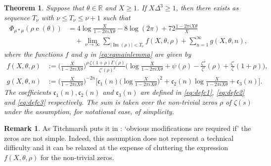 \documentclass[11pt]{amsart}
\numberwithin{equation}{section}
\numberwithin{figure}{section}
\newtheorem{theorem}{Theorem}[section]
\theoremstyle{definition}
\newtheorem{remark}{Remark}[section]
\newcommand{\R}{\mathbb{R}}
\newcommand{\e}{\operatorname{e}}
\begin{document}
\begin{theorem} \label{lem:principalmajor}
Suppose that $\theta \in \R$ and $X \ge 1$. If $X \Delta^3 \ge 1$, then there exists as sequence $T_{\nu}$ with $\nu \leqslant T_\nu \leqslant \nu+1$ such that
\begin{align} \label{eq:eqmainlemma}
    \Phi_{\mu * \mu}(\rho \e(\theta)) &= 4 \log \frac{X}{1-2\pi i X\theta} - 8 \log(2 \pi) + 72 \frac{1-2\pi i X\theta}{X}\nonumber \\
    & \quad + \lim_{\nu \to \infty} \sum_{|\operatorname{Im}(\rho)| < T_\nu}  f(X,\theta,\rho)  +\sum_{n=1}^{\infty} g(X,\theta,n),
\end{align}
where the functions $f$ and $g$ in \eqref{eq:eqmainlemma} are given by
\begin{align}
    f(X, \theta, \rho) &:= \bigg(\frac{X}{1-2\pi i X\theta}\bigg)^{\rho}\frac{\zeta (1 + \rho )\Gamma (\rho )}{{\zeta '{{(\rho )}^2}}} \bigg(\log \frac{X}{1-2\pi i X\theta} + \psi (\rho ) - \frac{{\zeta ''}}{{\zeta '}}(\rho ) + \frac{{\zeta '}}{\zeta }(1 + \rho ) \bigg), \nonumber \\
    g(X,\theta,n) &:= \bigg(\frac{X}{1-2\pi i X\theta}\bigg)^{-2 n} \bigg[\mathfrak{c}_1(n) \bigg(\log \frac{X}{1-2\pi i X\theta}\bigg)^2 + \mathfrak{c}_2(n) \log \frac{X}{1-2\pi i X\theta}+ \mathfrak{c}_3(n) \bigg]. \nonumber 
\end{align}
The coefficients $\mathfrak{c}_1(n), \mathfrak{c}_2(n)$ and $\mathfrak{c}_3(n)$ are defined in \eqref{eq:defc1}, \eqref{eq:defc2} and \eqref{eq:defc3} respectively. The sum is taken over the non-trivial zeros $\rho$ of $\zeta(s)$ under the assumption, for notational ease, of simplicity.
\end{theorem}

\begin{remark}
As Titchmarsh puts it in \cite[$\mathsection$14.27]{Titchmarsh}: `obvious modifications are required if' the zeros are not simple. Indeed, this assumption does not represent a technical difficulty and it can be relaxed at the expense of cluttering the expression $f(X,\theta,\rho)$ for the non-trivial zeros.
\end{remark}
\end{document}
